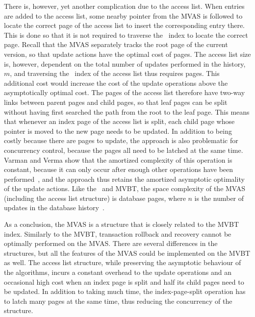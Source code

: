 There is, however, yet another complication due to the access list.
When entries are added to the access list, some nearby pointer from the MVAS
is followed to locate the correct page of the access list to insert the
corresponding entry there.
This is done so that it is not required to traverse the \Btree\ index to
locate the correct page.
Recall that the MVAS separately tracks the root page of the current version,
so that update actions have the optimal cost of  pages.
The access list size is, however, dependent on the total number of updates
performed in the history, $m$, and traversing the \Btree\ index of the access
list thus requires  pages. 
This additional cost would increase the cost of the update operations above
the asymptotically optimal cost.
The pages of the access list therefore have two-way links between parent
pages and child pages, so that leaf pages can be split without having first
searched the path from the root to the leaf page.
This means that whenever an index page of the access list is split, each child
page whose pointer is moved to the new page needs to be updated.
In addition to being costly because there are \OhT{\capacity} pages to update,
the approach is also problematic for concurrency control, because the pages
all need to be latched at the same time.
Varman and Verma show that the amortized complexity of this operation is
constant, because it can only occur after enough other operations have been
performed~\cite{varman:1997:multiversion}, and the approach thus retains the
amortized asymptotic optimality of the update actions.
Like the \TSBtree\ and MVBT, the space complexity of the MVAS (including the
access list structure) is  database
pages, where $n$ is the number of updates in the database
history~\cite{varman:1997:multiversion}.

As a conclusion, the MVAS is a structure that is closely related to the
MVBT index. 
Similarly to the MVBT, transaction rollback and recovery cannot be optimally
performed on the MVAS\@.
There are several differences in the structures, but all the features of the
MVAS could be implemented on the MVBT as well.
The access list structure, while preserving the asymptotic behaviour of
the algorithms, incurs a constant overhead to the update operations and
an occasional high cost when an index page is split and half its
child pages need to be updated.
In addition to taking much time, the index-page-split operation has to latch
many pages at the same time, thus reducing the concurrency of the structure.
